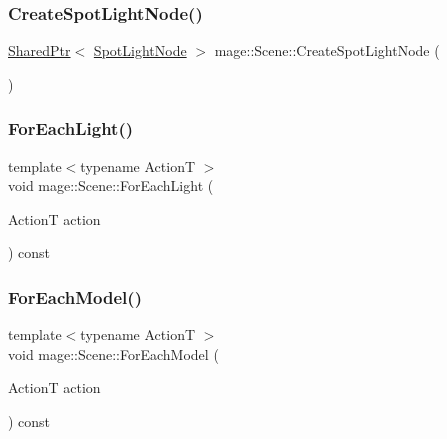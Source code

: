 \hypertarget{classmage_1_1_scene_a27ffb510eeb8e208ba20ee0d76138a3f}{}\label{classmage_1_1_scene_a27ffb510eeb8e208ba20ee0d76138a3f} 
\subsubsection{\texorpdfstring{Create\+Spot\+Light\+Node()}{CreateSpotLightNode()}}
{\footnotesize\ttfamily \hyperlink{namespacemage_a1e01ae66713838a7a67d30e44c67703e}{Shared\+Ptr}$<$ \hyperlink{namespacemage_aeed5dee4ff6c591eabb0e9114256df4a}{Spot\+Light\+Node} $>$ mage\+::\+Scene\+::\+Create\+Spot\+Light\+Node (\begin{DoxyParamCaption}{ }\end{DoxyParamCaption})}

\hypertarget{classmage_1_1_scene_a131c27235c6f172a316c56fea7f2e80c}{}\label{classmage_1_1_scene_a131c27235c6f172a316c56fea7f2e80c} 
\subsubsection{\texorpdfstring{For\+Each\+Light()}{ForEachLight()}}
{\footnotesize\ttfamily template$<$typename ActionT $>$ \\
void mage\+::\+Scene\+::\+For\+Each\+Light (\begin{DoxyParamCaption}\item[{ActionT}]{action }\end{DoxyParamCaption}) const\hspace{0.3cm}{\ttfamily [private]}}

\hypertarget{classmage_1_1_scene_a6327548021f874f22a1adc81cfc8a1ea}{}\label{classmage_1_1_scene_a6327548021f874f22a1adc81cfc8a1ea} 
\subsubsection{\texorpdfstring{For\+Each\+Model()}{ForEachModel()}}
{\footnotesize\ttfamily template$<$typename ActionT $>$ \\
void mage\+::\+Scene\+::\+For\+Each\+Model (\begin{DoxyParamCaption}\item[{ActionT}]{action }\end{DoxyParamCaption}) const\hspace{0.3cm}{\ttfamily [private]}}

